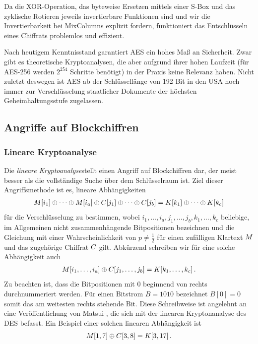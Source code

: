 Da die XOR-Operation, das byteweise Ersetzen mittels einer S-Box und das zyklische Rotieren jeweils invertierbare Funktionen sind und wir die Invertierbarkeit bei MixColumns explizit fordern, funktioniert das Entschlüsseln eines Chiffrats problemlos und effizient.

Nach heutigem Kenntnisstand garantiert AES ein hohes Maß an Sicherheit. Zwar gibt es theoretische Kryptoanalysen, die aber aufgrund ihrer hohen Laufzeit (für AES-256 werden $2^{254}$ Schritte benötigt) in der Praxis keine Relevanz haben. Nicht zuletzt deswegen ist AES ab der Schlüssellänge von 192 Bit in den USA noch immer zur Verschlüsselung staatlicher Dokumente der höchsten Geheimhaltungsstufe zugelassen.

\subsection{Angriffe auf Blockchiffren}
\subsubsection{Lineare Kryptoanalyse}\label{sssec:linKryptoanalyse}
Die \emph{lineare Kryptoanalyse}\indexLinCrypt stellt einen Angriff auf Blockchiffren dar, der meist besser als die vollständige Suche über dem Schlüsselraum ist. Ziel dieser Angriffsmethode ist es, lineare Abhängigkeiten
\begin{align}\label{approx}
	M[i_{1}] \oplus \dots \oplus M[i_{a}] \oplus C[j_{1}] \oplus \dots \oplus C[j_{b}] = K[k_{1}] \oplus \dots \oplus K[k_{c}]
\end{align}
für die Verschlüsselung zu bestimmen, wobei $i_{1},\dots,i_{a},j_{1},\dots,j_{b},k_{1},\dots,k_{c}$ beliebige, im Allgemeinen nicht zusammenhängende Bitpositionen bezeichnen und die Gleichung mit einer Wahrscheinlichkeit von $p \neq \frac{1}{2}$ für einen zufälligen Klartext $M$ und das zugehörige Chiffrat $C$ gilt. Abkürzend schreiben wir für eine solche Abhängigkeit auch
\begin{align*}
	M[i_{1},\dots,i_{a}] \oplus C[j_{1},\dots,j_{b}] = K[k_{1},\dots,k_{c}]\, .
\end{align*}
Zu beachten ist, dass die Bitpositionen mit $0$ beginnend von rechts durchnummeriert werden.
\label{matsui-notation}Für einen Bitstrom $B = 1010$ bezeichnet $B[0] = 0$ somit das am weitesten rechts stehende Bit. Diese Schreibweise ist angelehnt an eine Veröffentlichung von Matsui \cite{Matsui1994}, die sich mit der linearen Kryptonanalyse des DES befasst.
Ein Beispiel einer solchen linearen Abhängigkeit ist
\begin{align*}
	M[1, 7] \oplus C[3, 8] = K[3, 17]\, .
\end{align*}

